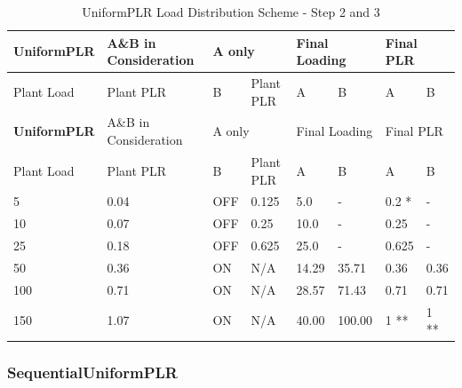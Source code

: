 \begin{longtable}[c]{|l|l|l|l|l|l|l|l|}
    \caption{UniformPLR Load Distribution Scheme - Step 2 and 3}
    \label{tab:uniformplr-load-overview-step23}\\
\hline
\textbf{UniformPLR} & A\&B in Consideration & \multicolumn{2}{l|}{A only} & \multicolumn{2}{l|}{Final Loading} & \multicolumn{2}{l|}{Final PLR} \\ \hline
Plant Load & Plant PLR             & B         & Plant PLR       & A               & B                & A              & B             \\ \hline
\endfirsthead
\hline
\textbf{UniformPLR} & A\&B in Consideration & \multicolumn{2}{l|}{A only} & \multicolumn{2}{l|}{Final Loading} & \multicolumn{2}{l|}{Final PLR} \\ \hline
Plant Load & Plant PLR             & B         & Plant PLR       & A               & B                & A              & B             \\ \hline
\endhead

5          & 0.04                  & OFF       & 0.125           & 5.0           & -                  & 0.2 *          & -             \\ \hline
10         & 0.07                  & OFF       & 0.25            & 10.0            & -                & 0.25           & -             \\ \hline
25         & 0.18                  & OFF       & 0.625           & 25.0            & -                & 0.625          & -             \\ \hline
50         & 0.36                  & ON        & N/A             & 14.29           & 35.71            & 0.36           & 0.36          \\ \hline
100        & 0.71                  & ON        & N/A             & 28.57           & 71.43            & 0.71           & 0.71          \\ \hline
150        & 1.07                  & ON        & N/A             & 40.00           & 100.00           & 1 **           & 1 **          \\ \hline

\end{longtable}




\subsubsection{SequentialUniformPLR}%
\label{ssub:sequentialuniformplr}

